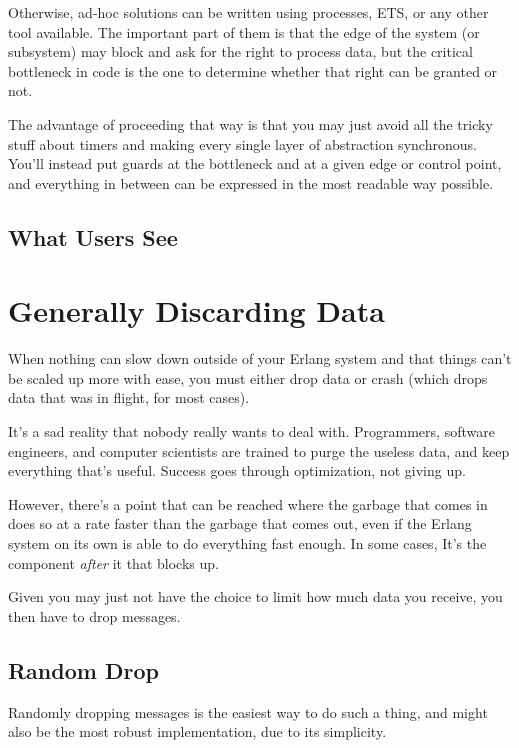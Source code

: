 \documentclass[11pt, oneside]{book}   	%
\begin{document}
Otherwise, ad-hoc solutions can be written using processes, ETS, or any other tool available. The important part of them is that the edge of the system (or subsystem) may block and ask for the right to process data, but the critical bottleneck in code is the one to determine whether that right can be granted or not.

The advantage of proceeding that way is that you may just avoid all the tricky stuff about timers and making every single layer of abstraction synchronous. You'll instead put guards at the bottleneck and at a given edge or control point, and everything in between can be expressed in the most readable way possible.

\subsection{What Users See}
 
 


\section{Generally Discarding Data}

When nothing can slow down outside of your Erlang system and that things can't be scaled up more with ease, you must either drop data or crash (which drops data that was in flight, for most cases).

It's a sad reality that nobody really wants to deal with. Programmers, software engineers, and computer scientists are trained to purge the useless data, and keep everything that's useful. Success goes through optimization, not giving up.

However, there's a point that can be reached where the garbage that comes in does so at a rate faster than the garbage that comes out, even if the Erlang system on its own is able to do everything fast enough. In some cases, It's the component \emph{after} it that blocks up.

Given you may just not have the choice to limit how much data you receive, you then have to drop messages.

\subsection{Random Drop}

Randomly dropping messages is the easiest way to do such a thing, and might also be the most robust implementation, due to its simplicity.
\end{document}
